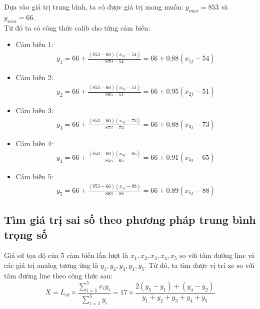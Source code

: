             \hspace*{0.6cm}Dựa vào giá trị trung bình, ta có được giá trị mong muốn: $y_{max} = 853$ và $y_{min} = 66$.\\
            \hspace*{0.6cm}Từ đó ta có công thức calib cho từng cảm biến:
            \begin{itemize}
                \item Cảm biến 1:
                \begin{align*}
                    y_1 = 66 + \frac{(853 - 66)(x_{1j} - 54)}{870 - 54} = 66 + 0.88(x_{1j} - 54)
                \end{align*}
                \item Cảm biến 2:
                \begin{align*}
                    y_2 = 66 + \frac{(853 - 66)(x_{2j} - 51)}{805 - 51} = 66 + 0.95(x_{2j} - 51)
                \end{align*}
                \item Cảm biến 3:
                \begin{align*}
                    y_3 = 66 + \frac{(853 - 66)(x_{3j} - 73)}{872 - 73} = 66 + 0.88(x_{3j} - 73)
                \end{align*}
                \item Cảm biến 4:
                \begin{align*}
                    y_4 = 66 + \frac{(853 - 66)(x_{4j} - 65)}{855 - 65} = 66 + 0.91(x_{4j} - 65)
                \end{align*}
                \item Cảm biến 5:
                \begin{align*}
                    y_5 = 66 + \frac{(853 - 66)(x_{5j} - 88)}{863 - 88} = 66 + 0.89(x_{5j} - 88)
                \end{align*}
            \end{itemize}
        \subsection{Tìm giá trị sai số theo phương pháp trung bình trọng số}
            \hspace*{0.6cm}Giá sử tọa độ của 5 cảm biến lần lượt là $x_1, x_2, x_3, x_4, x_5$ so với tâm đường line và các giá trị analog tương ứng là $y_1, y_2, y_3, y_4, y_5$. Từ đó, ta tìm được vị trí xe so với tâm đường line theo công thức sau:
            \begin{equation}
                X = L_{cb} \times \frac{\sum_{i=1}^{5} x_i y_i}{\sum_{i=1}^{5} y_i} = 17 \times \frac{2(y_5 - y_1) + (y_4 - y_2)}{y_1 + y_2 + y_3 + y_4 + y_5}
                \label{eq:4-7}
            \end{equation}

